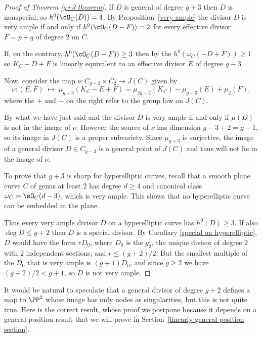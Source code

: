 \begin{proof}[Proof of Theorem \ref{g+3 theorem}]
If 
$D$ is general of degree $g+3$ then $D$ is nonspecial, 
so $h^0(\cO_C(D)) = 4$. By Proposition~\ref{very ample} the divisor
$D$ is very ample if and only if $h^0(\cO_C(D-F)) = 2$
for every effective divisor $F = p+q$ of degree 2 on $C$.

If, on the contrary, $h^0(\cO_C(D-F)) \geq 3$ then by the 
%
$h^0(\omega_C(-D + F)) \geq 1$
so $K_C - D + F$ is  linearly equivalent to 
an effective divisor $E$ of degree $g-3$.

Now, consider the map 
$\nu : C_{g-3} \times C_{2}  \to  J(C)$
given by
$$
\nu : (E,F) \; \mapsto \; \mu_{g-3}(K_C - E + F) = \mu_{2g-2}(K_C) - \mu_{g-3}(E) + \mu_{2}(F), 
$$
where the $+$ and $-$ on the right refer to the group law on $J(C)$. 

By what we have just said and 
%
the divisor $D$ is very ample if and only if
$\mu(D)$ 
is not in the image of $\nu$.
However the source of $\nu$ has dimension $g-3+2 = g-1$, so its image
in $J(C)$ is a proper subvariety. Since $\mu_{g+3}$ is surjective, the
image of a general divisor $D \in C_{g-3}$ is a general point of
$J(C)$ and thus will not lie in the image of $\nu$.

To prove that $g+3$ is sharp for hyperelliptic curves, recall that a
%
smooth plane curve $C$ of genus 
at least $2$
has degree $d\geq 4$ and canonical class 
$\omega_{C} = \sO_{C}(d-\nobreak 3)$, which is very ample. 
This shows that
no hyperelliptic curve  can
be embedded in the plane.

Thus every very ample divisor $D$ on a hyperelliptic curve  has $h^0(D) \geq 3$. If also $\deg D \leq g+2$
then $D$ is a special divisor. By Corollary \ref{special on hyperelliptic}, $D$ would have the form
$rD_0$, where $D_0$ is the $g^1_2$, the unique divisor of degree 2 with 2 independent sections,
and $r \leq (g+2)/2$. But the smallest multiple of the $D_0$ that is very ample is $(g+1)D_0$, and
since $g\geq 2$ we have $(g+2)/2 < g+1$, so $D$ is not very ample.
\unif
\end{proof}

It would be natural to speculate that a general divisor of degree $g+2$ defines a map to $\PP^2$ whose
image has only nodes as singularities, but this is not quite true. Here is the correct result,
whose proof we postpone 
because it depends on a general position result that 
we will prove in Section~\ref{linearly general position section}.

